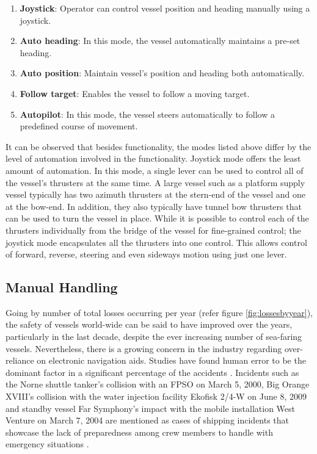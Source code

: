 \begin{enumerate}[noitemsep]

\item \textbf{Joystick}: Operator can control vessel position and heading manually using a joystick. 
\item \textbf{Auto heading}: In this mode, the vessel automatically maintains a pre-set heading. 
\item \textbf{Auto position}: Maintain vessel's position and heading both automatically. 
\item \textbf{Follow target}: Enables the vessel to follow a moving target. 
\item \textbf{Autopilot}: In this mode, the vessel steers automatically to follow a predefined course of movement. 

\end{enumerate}

It can be observed that besides functionality, the modes listed above differ by the level of automation involved in the functionality. Joystick mode offers the least amount of automation. In this mode, a single lever can be used to control all of the vessel's thrusters at the same time. A large vessel such as a platform supply vessel typically has two azimuth thrusters at the stern-end of the vessel and one at the bow-end. In addition, they also typically have tunnel bow thrusters that can be used to turn the vessel in place. While it is possible to control each of the thrusters individually from the bridge of the vessel for fine-grained control; the joystick mode encapsulates all the thrusters into one control. This allows control of forward, reverse, steering and even sideways motion using just one lever. 


\subsection{Manual Handling}
Going by number of total losses occurring per year (refer figure \ref{fig:lossesbyyear}), the safety of vessels world-wide can be said to have improved over the years, particularly in the last decade, despite the ever increasing number of sea-faring vessels. Nevertheless, there is a growing concern in the industry regarding over-reliance on electronic navigation aids. Studies have found human error to be the dominant factor in a significant percentage of the accidents \parencite{baker2005accident, hauff2014analysis}. Incidents such as the Norne shuttle tanker's collision with an FPSO on March 5, 2000, Big Orange XVIII's collision with the water injection facility Ekofisk 2/4-W on June 8, 2009 and standby vessel Far Symphony's impact with the mobile installation West Venture on March 7, 2004 are mentioned as cases of shipping incidents that showcase the lack of preparedness among crew members to handle with emergency situations \parencite{vinnem2013offshore}.

